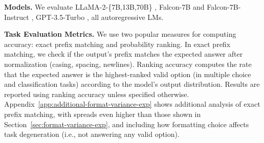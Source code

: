 \documentclass{article} %
\renewcommand{\paragraph}[1]{\textbf{#1}}
\begin{document}
\paragraph{Models.} We evaluate LLaMA-2-\{7B,13B,70B\} \citep{touvron2023llama}, Falcon-7B and Falcon-7B-Instruct \citep{falcon40b}, GPT-3.5-Turbo \citep{schulman2022chatgpt}, all autoregressive LMs.%

\paragraph{Task Evaluation Metrics.} 
We use two popular measures for computing accuracy: exact prefix matching and probability ranking. 
In exact prefix matching, we check if the output's prefix matches the expected answer after normalization (casing, spacing, newlines). 
Ranking accuracy computes the rate that the expected answer is the highest-ranked valid option (in multiple choice and classification tasks) according to the model's output distribution.
Results are reported using ranking accuracy unless specified otherwise. 
Appendix~\ref{app:additional-format-variance-exp} shows additional analysis of exact prefix matching, with spreads even higher than those shown in Section~\ref{sec:format-variance-exp}, and including how formatting choice affects task degeneration (i.e., not answering any valid option).  %

\vspace{-1mm}
\end{document}
